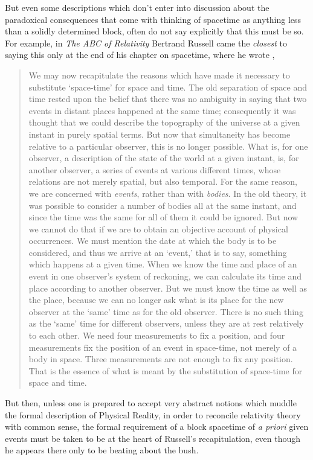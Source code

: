 But even some descriptions which don't enter into discussion about the paradoxical consequences that come with thinking of spacetime as anything less than a solidly determined block, often do not say explicitly that this must be so. For example, in \textit{The ABC of Relativity} Bertrand Russell came the \textit{closest} to saying this only at the end of his chapter on spacetime, where he wrote \cite{Russell1969},
\begin{quotation}
We may now recapitulate the reasons which have made it necessary to substitute `space-time' for space and time. The old separation of space and time rested upon the belief that there was no ambiguity in saying that two events in distant places happened at the same time; consequently it was thought that we could describe the topography of the universe at a given instant in purely spatial terms. But now that simultaneity has become relative to a particular observer, this is no longer possible. What is, for one observer, a description of the state of the world at a given instant, is, for another observer, a series of events at various different times, whose relations are not merely spatial, but also temporal. For the same reason, we are concerned with \textit{events}, rather than with \textit{bodies}. In the old theory, it was possible to consider a number of bodies all at the same instant, and since the time was the same for all of them it could be ignored. But now we cannot do that if we are to obtain an objective account of physical occurrences. We must mention the date at which the body is to be considered, and thus we arrive at an `event,' that is to say, something which happens at a given time. When we know the time and place of an event in one observer's system of reckoning, we can calculate its time and place according to another observer. But we must know the time as well as the place, because we can no longer ask what is its place for the new observer at the `same' time as for the old observer. There is no such thing as the `same' time for different observers, unless they are at rest relatively to each other. We need four measurements to fix a position, and four measurements fix the position of an event in space-time, not merely of a body in space. Three measurements are not enough to fix any position. That is the essence of what is meant by the substitution of space-time for space and time.
\end{quotation}
But then, unless one is prepared to accept very abstract notions which muddle the formal description of Physical Reality, in order to reconcile relativity theory with common sense, the formal requirement of a block spacetime of \textit{a priori} given events must be taken to be at the heart of Russell's recapitulation, even though he appears there only to be beating about the bush.

